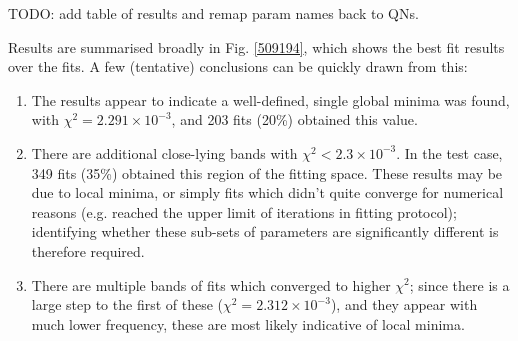 TODO: add table of results and remap param names back to QNs.

Results are summarised broadly in Fig. \ref{509194}, which shows the best fit results over the fits. A few (tentative) conclusions can be quickly drawn from this:

\begin{enumerate}
\item The results appear to indicate a well-defined, single global minima was found, with $\chi^2 = 2.291\times10^{-3}$, and 203 fits (20\%) obtained this value.
\item There are additional close-lying bands with $\chi^2 < 2.3\times10^{-3}$. In the test case, 349 fits (35\%) obtained this region of the fitting space. These results may be due to local minima, or simply fits which didn't quite converge for numerical reasons (e.g. reached the upper limit of iterations in fitting protocol); identifying whether these sub-sets of parameters are significantly different is therefore required.
\item There are multiple bands of fits which converged to higher $\chi^2$; since there is a large step to the first of these ($\chi^2 = 2.312\times10^{-3}$), and they appear with much lower frequency, these are most likely indicative of local minima.


\end{enumerate}
